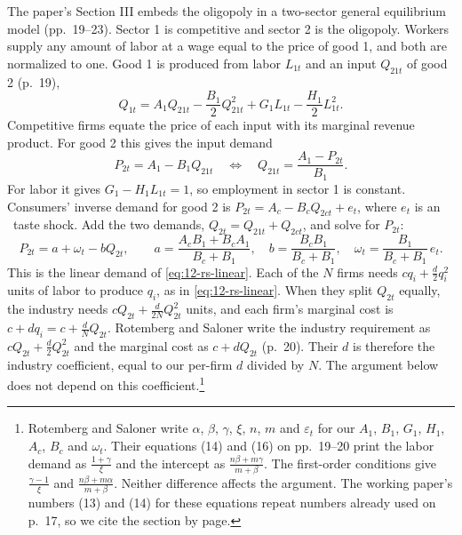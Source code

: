 The paper's Section III embeds the oligopoly in a two-sector general equilibrium model (pp.~19--23). Sector 1 is
competitive and sector 2 is the oligopoly. Workers supply any amount of labor at a wage equal to the price of good 1,
and both are normalized to one. Good 1 is produced from labor $L_{1t}$ and an input $Q_{21t}$ of good 2 (p.~19),
\begin{equation}\label{eq:12-rs-ge-prod}
Q_{1t} = A_1Q_{21t} - \frac{B_1}{2}Q_{21t}^2 + G_1L_{1t} - \frac{H_1}{2}L_{1t}^2 .
\end{equation}
Competitive firms equate the price of each input with its marginal revenue product. For good 2 this gives the input
demand
\begin{equation*}
P_{2t} = A_1 - B_1Q_{21t}
\quad\Longleftrightarrow\quad
Q_{21t} = \frac{A_1 - P_{2t}}{B_1} .
\end{equation*}
For labor it gives $G_1 - H_1L_{1t} = 1$, so employment in sector 1 is constant. Consumers' inverse demand for good 2
is $P_{2t} = A_c - B_cQ_{2ct} + e_t$, where $e_t$ is an \iid\ taste shock. Add the two demands,
$Q_{2t} = Q_{21t} + Q_{2ct}$, and solve for $P_{2t}$:
\begin{equation*}
P_{2t} = a + \omega_t - bQ_{2t},
\qquad
a = \frac{A_cB_1 + B_cA_1}{B_c + B_1},
\quad
b = \frac{B_cB_1}{B_c + B_1},
\quad
\omega_t = \frac{B_1}{B_c + B_1}\,e_t .
\end{equation*}
This is the linear demand of \eqref{eq:12-rs-linear}. Each of the $N$ firms needs $cq_i + \frac{d}{2}q_i^2$ units of
labor to produce $q_i$, as in \eqref{eq:12-rs-linear}. When they split $Q_{2t}$ equally, the industry needs
$cQ_{2t} + \frac{d}{2N}Q_{2t}^2$ units, and each firm's marginal cost is $c + dq_i = c + \frac{d}{N}Q_{2t}$. Rotemberg and
Saloner write the industry requirement as $cQ_{2t} + \frac{d}{2}Q_{2t}^2$ and the marginal cost as $c + dQ_{2t}$
(p.~20). Their $d$ is therefore the industry coefficient, equal to our per-firm $d$ divided by $N$. The argument
below does not depend on this coefficient.\footnote{Rotemberg and Saloner
write $\alpha$, $\beta$, $\gamma$, $\xi$, $n$, $m$ and $\varepsilon_t$ for our $A_1$, $B_1$, $G_1$, $H_1$, $A_c$, $B_c$ and
$\omega_t$. Their equations (14) and (16) on pp.~19--20 print the labor demand as $\frac{1 + \gamma}{\xi}$ and the
intercept as $\frac{n\beta + m\gamma}{m + \beta}$. The first-order conditions give $\frac{\gamma - 1}{\xi}$ and
$\frac{n\beta + m\alpha}{m + \beta}$. Neither difference affects the argument. The working paper's numbers (13) and
(14) for these equations repeat numbers already used on p.~17, so we cite the section by page.}

